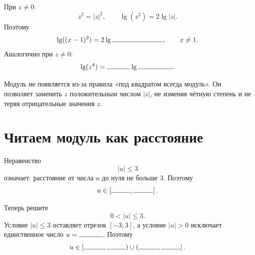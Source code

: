 \begin{fillbox}
  При \(z\ne0\):
  \[
    z^2=|z|^2,
    \qquad
    \lg(z^2)=2\lg|z|.
  \]
  Поэтому
  \[
    \lg((x-1)^2)=2\lg\answerblank[26mm],
    \qquad x\ne1.
  \]
  Аналогично при \(z\ne0\):
  \[
    \lg(z^4)=\answerblank[12mm]\lg\answerblank[18mm].
  \]
\end{fillbox}

\begin{warningbox}
  Модуль не появляется из-за правила «под квадратом всегда модуль».
  Он позволяет заменить \(z\) положительным числом \(|z|\), не изменяя
  чётную степень и не теряя отрицательные значения \(z\).
\end{warningbox}

\newpage
\section{Читаем модуль как расстояние}

\begin{methodintro}
  Неравенство
  \[
    |u|\le3
  \]
  означает: расстояние от числа \(u\) до нуля не больше \(3\).
  Поэтому
  \[
    u\in\left[\answerblank[10mm],\answerblank[10mm]\right].
  \]
\end{methodintro}

\begin{center}
\end{center}

\begin{checkpointbox}
  Теперь решите
  \[
    0<|u|\le3.
  \]
  Условие \(|u|\le3\) оставляет отрезок \([-3;3]\), а условие
  \(|u|>0\) исключает единственное число \(u=\answerblank[12mm]\).
  Поэтому
  \[
    u\in
    \left[\answerblank[10mm],\answerblank[10mm]\right)
    \cup
    \left(\answerblank[10mm],\answerblank[10mm]\right].
  \]
\end{checkpointbox}

\begin{center}
\end{center}

